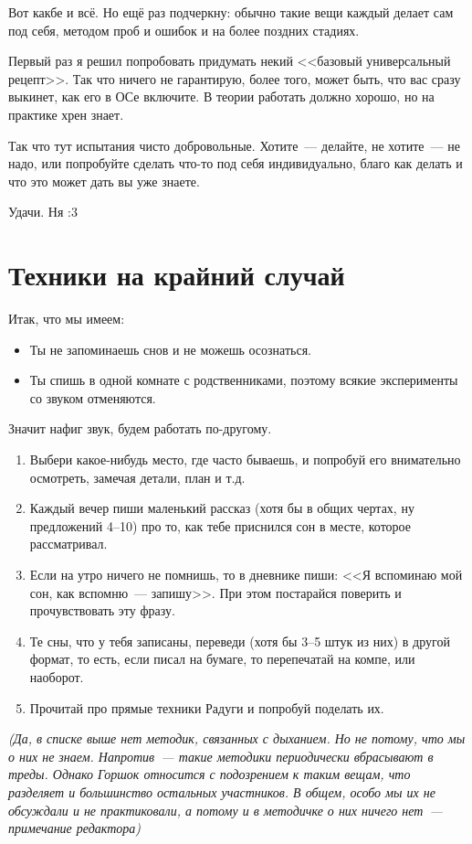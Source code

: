 \documentclass[a5paper,12pt,twoside]{memoir}
\begin{document}
Вот какбе и всё. Но ещё раз подчеркну: обычно такие вещи каждый делает сам под себя, методом проб и ошибок и на более поздних стадиях. 

Первый раз я решил попробовать придумать некий <<базовый универсальный рецепт>>. Так что ничего не гарантирую, более того, может быть, что вас сразу выкинет, как его в ОСе включите. В теории работать должно хорошо, но на практике хрен знает.

Так что тут испытания чисто добровольные. Хотите~--- делайте, не хотите~--- не надо, или попробуйте сделать что-то под себя индивидуально, благо как делать и что это может дать вы уже знаете. 

Удачи. Ня :3 



\chapter{Техники на крайний случай}
Итак, что мы имеем:
\begin{itemize}
\item Ты не запоминаешь снов и не можешь осознаться.
\item Ты спишь в одной комнате с родственниками, поэтому всякие эксперименты со звуком отменяются.
\end{itemize}

Значит нафиг звук, будем работать по-другому. 

\begin{enumerate}
\item Выбери какое-нибудь место, где часто бываешь, и попробуй его внимательно осмотреть, замечая детали, план и т.д.
\item Каждый вечер пиши маленький рассказ (хотя бы в общих чертах, ну предложений 4--10) про то, как тебе приснился сон в месте, которое рассматривал.
\item Если на утро ничего не помнишь, то в дневнике пиши: <<Я вспоминаю мой сон, как вспомню~--- запишу>>. При этом постарайся поверить и прочувствовать эту фразу. 
\item Те сны, что у тебя записаны, переведи (хотя бы 3--5 штук из них) в другой формат, то есть, если писал на бумаге, то перепечатай на компе, или наоборот. 
\item Прочитай про прямые техники Радуги и попробуй поделать их.
\end{enumerate} %


\textit{(Да, в списке выше нет методик, связанных с дыханием. Но не потому, что мы о них не знаем. Напротив~--- такие методики периодически вбрасывают в треды. Однако Горшок относится с подозрением к таким вещам, что разделяет и большинство остальных участников. В общем, особо мы их не обсуждали и не практиковали, а потому и в методичке о них ничего нет~---примечание редактора)}
\end{document}
